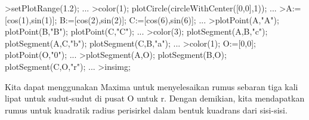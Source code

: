 \documentclass[12pt,arial,letterpaper]{book}
\begin{document}
\begin{eulercomment}
\begin{eulercomment}
\begin{eulercomment}
\begin{eulercomment}
\begin{eulercomment}
\begin{eulercomment}
\begin{eulercomment}
\begin{eulercomment}
\begin{eulercomment}
\begin{eulercomment}
\begin{eulercomment}
\begin{eulercomment}
\begin{eulercomment}
\begin{eulercomment}
\begin{eulercomment}
\begin{eulercomment}
\begin{eulercomment}
\begin{eulercomment}
\begin{eulercomment}
\begin{eulercomment}
\begin{eulercomment}
\begin{eulercomment}
\begin{eulercomment}
\begin{eulercomment}
\begin{eulercomment}
\begin{eulercomment}
\begin{eulercomment}
\begin{eulercomment}
\begin{eulerprompt}
>setPlotRange(1.2); ...
>color(1); plotCircle(circleWithCenter([0,0],1)); ...
>A:=[cos(1),sin(1)]; B:=[cos(2),sin(2)]; C:=[cos(6),sin(6)]; ...
>plotPoint(A,"A"); plotPoint(B,"B"); plotPoint(C,"C"); ...
>color(3); plotSegment(A,B,"c"); plotSegment(A,C,"b"); plotSegment(C,B,"a"); ...
>color(1); O:=[0,0];  plotPoint(O,"0"); ...
>plotSegment(A,O); plotSegment(B,O); plotSegment(C,O,"r"); ...
>insimg;
\end{eulerprompt}
\begin{eulercomment}
Kita dapat menggunakan Maxima untuk menyelesaikan rumus sebaran tiga
kali lipat untuk sudut-sudut di pusat O untuk r. Dengan demikian, kita
mendapatkan rumus untuk kuadratik radius perisirkel dalam bentuk
kuadrans dari sisi-sisi.


\end{eulercomment}
\end{eulercomment}
\end{eulercomment}
\end{eulercomment}
\end{eulercomment}
\end{eulercomment}
\end{eulercomment}
\end{eulercomment}
\end{eulercomment}
\end{eulercomment}
\end{eulercomment}
\end{eulercomment}
\end{eulercomment}
\end{eulercomment}
\end{eulercomment}
\end{eulercomment}
\end{eulercomment}
\end{eulercomment}
\end{eulercomment}
\end{eulercomment}
\end{eulercomment}
\end{eulercomment}
\end{eulercomment}
\end{eulercomment}
\end{eulercomment}
\end{eulercomment}
\end{eulercomment}
\end{eulercomment}
\end{eulercomment}
\end{document}
